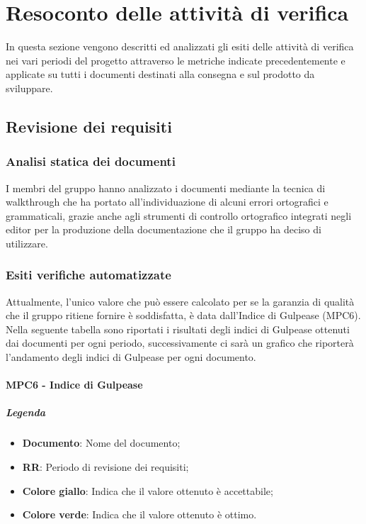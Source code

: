\section{Resoconto delle attività di verifica}
In questa sezione vengono descritti ed analizzati gli esiti delle attività di verifica nei vari periodi del progetto attraverso le metriche indicate precedentemente e applicate su tutti i documenti destinati alla consegna e sul prodotto da sviluppare.

\subsection{Revisione dei requisiti}

\subsubsection{Analisi statica dei documenti}
I membri del gruppo \Gruppo{} hanno analizzato i documenti mediante la tecnica di walkthrough che ha portato all'individuazione di 
alcuni errori ortografici e grammaticali, grazie anche agli strumenti di controllo ortografico integrati negli editor per la produzione
della documentazione che il gruppo ha deciso di utilizzare.

\subsubsection{Esiti verifiche automatizzate}
Attualmente, l'unico valore che può essere calcolato per  se la garanzia di qualità che il gruppo ritiene fornire è
soddisfatta, è data dall'Indice di Gulpease (MPC6).
Nella seguente tabella sono riportati i risultati degli indici di Gulpease ottenuti dai documenti per ogni periodo, successivamente ci sarà un grafico che riporterà l'andamento degli indici di Gulpease per ogni documento.


\paragraph{MPC6 - Indice di Gulpease}
\subparagraph{Legenda}
\begin{itemize}
	\item \textbf{Documento}: Nome del documento;
	\item \textbf{RR}: Periodo di revisione dei requisiti;
	\item  \textbf{Colore giallo}: Indica che il valore ottenuto è accettabile;
	\item  \textbf{Colore verde}: Indica che il valore ottenuto è ottimo. 
\end{itemize}

